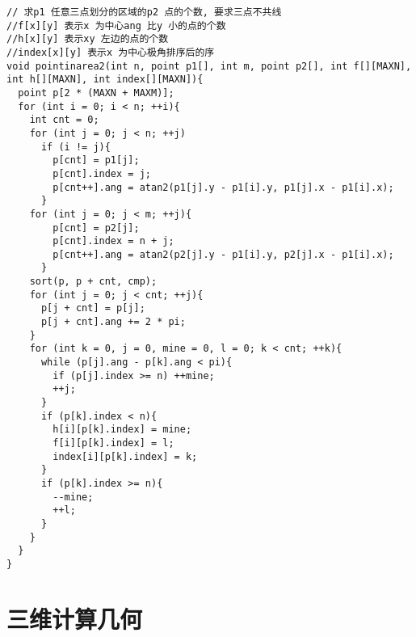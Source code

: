 \begin{lstlisting}[language={}]
// 求p1 任意三点划分的区域的p2 点的个数, 要求三点不共线  
//f[x][y] 表示x 为中心ang 比y 小的点的个数
//h[x][y] 表示xy 左边的点的个数
//index[x][y] 表示x 为中心极角排序后的序 
void pointinarea2(int n, point p1[], int m, point p2[], int f[][MAXN], int h[][MAXN], int index[][MAXN]){
  point p[2 * (MAXN + MAXM)];
  for (int i = 0; i < n; ++i){
    int cnt = 0;
    for (int j = 0; j < n; ++j)
      if (i != j){
        p[cnt] = p1[j];
        p[cnt].index = j;
        p[cnt++].ang = atan2(p1[j].y - p1[i].y, p1[j].x - p1[i].x);
      }
    for (int j = 0; j < m; ++j){
        p[cnt] = p2[j];
        p[cnt].index = n + j;
        p[cnt++].ang = atan2(p2[j].y - p1[i].y, p2[j].x - p1[i].x);
      }
    sort(p, p + cnt, cmp);
    for (int j = 0; j < cnt; ++j){
      p[j + cnt] = p[j];
      p[j + cnt].ang += 2 * pi;
    }
    for (int k = 0, j = 0, mine = 0, l = 0; k < cnt; ++k){
      while (p[j].ang - p[k].ang < pi){
        if (p[j].index >= n) ++mine;
        ++j;
      }
      if (p[k].index < n){
        h[i][p[k].index] = mine;
        f[i][p[k].index] = l;
        index[i][p[k].index] = k;
      }
      if (p[k].index >= n){
        --mine;
        ++l;
      }
    }
  }
}
\end{lstlisting}

\section{三维计算几何}
